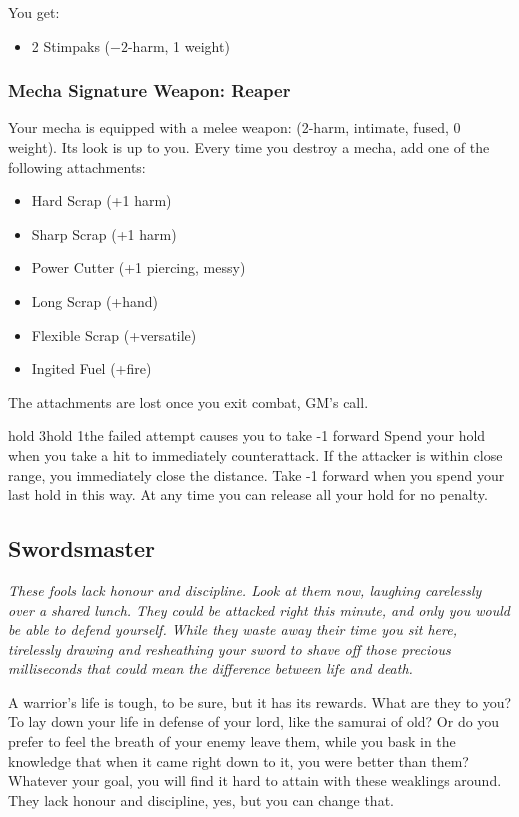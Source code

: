 You get:
\begin{itemize}
\item 2 Stimpaks ($-2$-harm, 1 weight)
\end{itemize}

\subsubsection{Mecha Signature Weapon: Reaper}
Your mecha is equipped with a melee weapon: (2-harm, intimate, fused, 0 weight). Its look is up to you.
Every time you destroy a mecha, add one of the following attachments:
\begin{itemize}
\item Hard Scrap (+1 harm)
\item Sharp Scrap (+1 harm)
\item Power Cutter (+1 piercing, messy)
\item Long Scrap (+hand)
\item Flexible Scrap (+versatile)
\item Ingited Fuel (+fire)
\end{itemize}
The attachments are lost once you exit combat, GM's call.

{hold 3}{hold 1}{the failed attempt causes you to take -1 forward}
Spend your hold when you take a hit to immediately counterattack. If the attacker is within close range, you immediately close the distance. Take -1 forward when you spend your last hold in this way. At any time you can release all your hold for no penalty.



\subsection{Swordsmaster}
{\itshape These fools lack honour and discipline. Look at them now, laughing carelessly over a shared lunch. They could be attacked right this minute, and only you would be able to defend yourself. While they waste away their time you sit here, tirelessly drawing and resheathing your sword to shave off those precious milliseconds that could mean the difference between life and death.

A warrior's life is tough, to be sure, but it has its rewards. What are they to you? To lay down your life in defense of your lord, like the samurai of old? Or do you prefer to feel the breath of your enemy leave them, while you bask in the knowledge that when it came right down to it, you were better than them? Whatever your goal, you will find it hard to attain with these weaklings around. They lack honour and discipline, yes, but you can change that.}

